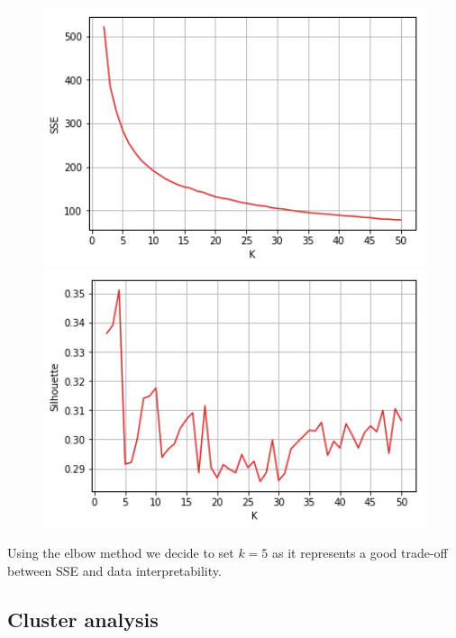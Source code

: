 \begin{figure}[h]
  \begin{minipage}[h]{.50\textwidth}
    \includegraphics[width=1\textwidth]{img/ch3/kmeans_sse}
  \end{minipage}
    \begin{minipage}[h]{.50\textwidth}
    \includegraphics[width=1\textwidth]{img/ch3/kmeans_silhouette}
  \end{minipage}
\end{figure}

Using the elbow method we decide to set $k=5$ as it represents a good trade-off between SSE and data interpretability.

\subsection{Cluster analysis}

